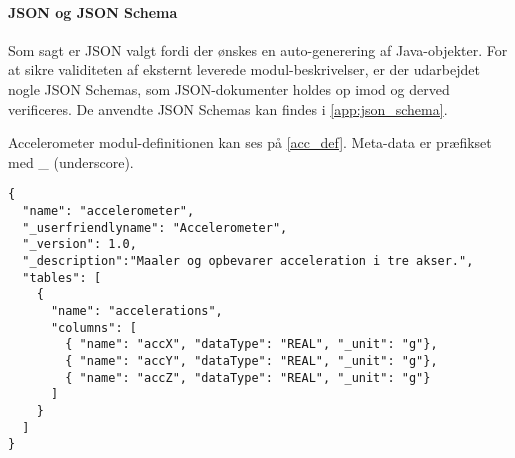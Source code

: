 \paragraph{JSON og JSON Schema}
Som sagt er JSON valgt fordi der ønskes en auto-generering af Java-objekter.
For at sikre validiteten af eksternt leverede modul-beskrivelser, er der udarbejdet nogle JSON Schemas, som JSON-dokumenter holdes op imod og derved verificeres.
De anvendte JSON Schemas kan findes i \cref{app:json_schema}.

Accelerometer modul-definitionen kan ses på \cref{acc_def}.
Meta-data er præfikset med \_ (underscore).
\begin{lstlisting}[label=acc_def,caption=Modul-definitionen for et accelerometer modul]
{
  "name": "accelerometer",
  "_userfriendlyname": "Accelerometer",
  "_version": 1.0,
  "_description":"Maaler og opbevarer acceleration i tre akser.",
  "tables": [
    {
      "name": "accelerations",
      "columns": [
        { "name": "accX", "dataType": "REAL", "_unit": "g"},
        { "name": "accY", "dataType": "REAL", "_unit": "g"},
        { "name": "accZ", "dataType": "REAL", "_unit": "g"}
      ]
    }
  ]
}
\end{lstlisting}